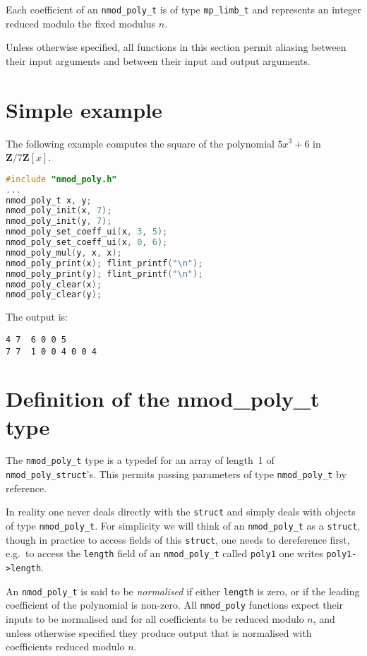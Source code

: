 \documentclass[a4paper,10pt]{book}
\newcommand{\Z}{\mathbf{Z}}%
\newcommand{\code}{\lstinline}
\begin{document}
{{Each coefficient of an \code{nmod_poly_t} is of type \code{mp_limb_t}
and represents an integer reduced modulo the fixed modulus $n$.

Unless otherwise specified, all functions in this section permit aliasing
between their input arguments and between their input and output arguments.

\section{Simple example}

The following example computes the square of the polynomial $5x^3 + 6$
in $\Z/7\Z[x]$.
\begin{lstlisting}[language=c]
#include "nmod_poly.h"
...
nmod_poly_t x, y;
nmod_poly_init(x, 7);
nmod_poly_init(y, 7);
nmod_poly_set_coeff_ui(x, 3, 5);
nmod_poly_set_coeff_ui(x, 0, 6);
nmod_poly_mul(y, x, x);
nmod_poly_print(x); flint_printf("\n");
nmod_poly_print(y); flint_printf("\n");
nmod_poly_clear(x);
nmod_poly_clear(y);
\end{lstlisting}

The output is:
\begin{lstlisting}
4 7  6 0 0 5
7 7  1 0 0 4 0 0 4
\end{lstlisting}

\section{Definition of the nmod\_poly\_t type}

The \code{nmod_poly_t} type is a typedef for an array of length~1 of
\code{nmod_poly_struct}'s.  This permits passing parameters of type
\code{nmod_poly_t} by reference.

In reality one never deals directly with the \code{struct} and simply deals
with objects of type \code{nmod_poly_t}.  For simplicity we will think of an
\code{nmod_poly_t} as a \code{struct}, though in practice to access fields
of this \code{struct}, one needs to dereference first, e.g.\ to access the
\code{length} field of an \code{nmod_poly_t} called \code{poly1} one writes
\code{poly1->length}.

An \code{nmod_poly_t} is said to be \emph{normalised} if either
\code{length} is zero, or if the leading coefficient of the polynomial is
non-zero.  All \code{nmod_poly} functions expect their inputs to be
normalised and for all coefficients to be reduced modulo $n$, and unless
otherwise specified they produce output that is normalised with
coefficients reduced modulo $n$.

}}
\end{document}
